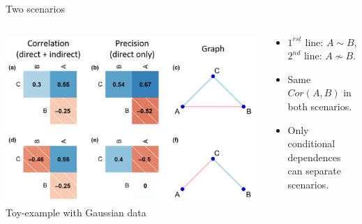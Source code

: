 \documentclass[11pt]{beamer}
\begin{document}
\begin{frame}{Two scenarios}
\begin{columns}
\begin{column}{0.65\linewidth}

\includegraphics[width=\linewidth]{images/cor_parcor.png}\\
 \small Toy-example with Gaussian data \citep{PWT19}\normalsize
\end{column}
\begin{column}{0.35\linewidth}
\begin{itemize}
\item $1^{rst}$ line: $A\sim B$, \\$2^{nd}$ line: $A \nsim B$.\vspace{0.5cm}
\item Same $Cor(A,B)$ in both scenarios.\vspace{0.5cm}
\item Only conditional dependences can separate scenarios.
\end{itemize}
\end{column}
\end{columns}
\end{frame}
\end{document}
